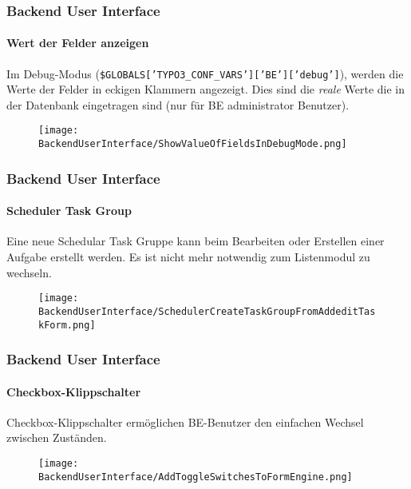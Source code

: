 \begin{frame}[fragile]
	\frametitle{Backend User Interface}
	\framesubtitle{Wert der Felder anzeigen}

	Im Debug-Modus (\texttt{\$GLOBALS['TYPO3\_CONF\_VARS']['BE']['debug']}),
	werden die Werte der Felder in eckigen Klammern angezeigt. Dies sind die
	\textit{reale} Werte die in der Datenbank eingetragen sind (nur für BE administrator
	Benutzer).

	\begin{figure}
		\texttt{[image: BackendUserInterface/ShowValueOfFieldsInDebugMode.png]}
	\end{figure}

\end{frame}


\begin{frame}[fragile]
	\frametitle{Backend User Interface}
	\framesubtitle{Scheduler Task Group}

	Eine neue Schedular Task Gruppe kann beim Bearbeiten oder Erstellen einer Aufgabe erstellt werden.
	Es ist nicht mehr notwendig zum Listenmodul zu wechseln.

	\begin{figure}
		\texttt{[image: BackendUserInterface/SchedulerCreateTaskGroupFromAddeditTaskForm.png]}
	\end{figure}

\end{frame}


\begin{frame}[fragile]
	\frametitle{Backend User Interface}
	\framesubtitle{Checkbox-Klippschalter}

	Checkbox-Klippschalter ermöglichen BE-Benutzer den einfachen Wechsel zwischen Zuständen.

	\begin{figure}
		\texttt{[image: BackendUserInterface/AddToggleSwitchesToFormEngine.png]}
	\end{figure}

\end{frame}


